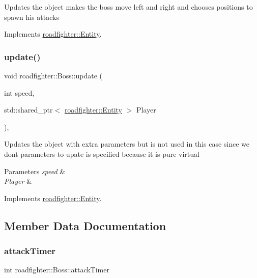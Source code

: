 Updates the object makes the boss move left and right and chooses positions to spawn his attacks 

Implements \hyperlink{classroadfighter_1_1Entity_a19cd353f12a3e8432acd6d5609137561}{roadfighter\+::\+Entity}.

\mbox{\label{classroadfighter_1_1Boss_a1754fba639f122f50e3eeb55980008b2}} 
\subsubsection{\texorpdfstring{update()}{update()}\hspace{0.1cm}{\footnotesize\ttfamily [2/2]}}
{\footnotesize\ttfamily void roadfighter\+::\+Boss\+::update (\begin{DoxyParamCaption}\item[{int}]{speed,  }\item[{std\+::shared\+\_\+ptr$<$ \hyperlink{classroadfighter_1_1Entity}{roadfighter\+::\+Entity} $>$}]{Player }\end{DoxyParamCaption})\hspace{0.3cm}{\ttfamily [override]}, {\ttfamily [virtual]}}

Updates the object with extra parameters but is not used in this case since we don\textquotesingle{}t parameters to upate is specified because it is pure virtual 
\begin{DoxyParams}{Parameters}
{\em speed} & \\
\hline
{\em Player} & \\
\hline
\end{DoxyParams}


Implements \hyperlink{classroadfighter_1_1Entity_a611ba56595dd2137d308876ba820cc09}{roadfighter\+::\+Entity}.



\subsection{Member Data Documentation}
\mbox{\label{classroadfighter_1_1Boss_ae8987be96a3b9f697f56e9c0a6552179}} 
\subsubsection{\texorpdfstring{attack\+Timer}{attackTimer}}
{\footnotesize\ttfamily int roadfighter\+::\+Boss\+::attack\+Timer\hspace{0.3cm}{\ttfamily [protected]}}

